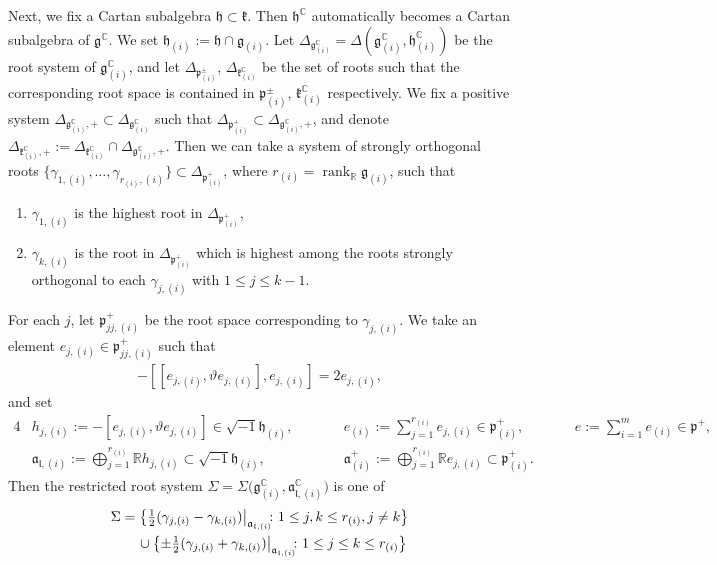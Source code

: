 \documentclass[pdftex]{sigma}
\numberwithin{equation}{section}
\newcommand{\BR}{\mathbb{R}}
\newcommand{\BC}{\mathbb{C}}
\newcommand{\fa}{\mathfrak{a}}
\newcommand{\fg}{\mathfrak{g}}
\newcommand{\fh}{\mathfrak{h}}
\newcommand{\fk}{\mathfrak{k}}
\newcommand{\fl}{\mathfrak{l}}
\newcommand{\fp}{\mathfrak{p}}
\newcommand{\rank}{\operatorname{rank}}
\begin{document}
Next, we fix a Cartan subalgebra $\fh\subset\fk$. Then $\fh^\BC$ automatically becomes a Cartan subalgebra of $\fg^\BC$.
We set $\fh_{(i)}:=\fh\cap\fg_{(i)}$.
Let $\Delta_{\fg^\BC_{(i)}}=\Delta(\fg^\BC_{(i)},\fh^{\BC}_{(i)})$ be the root system of $\fg^\BC_{(i)}$,
and let $\Delta_{\fp^\pm_{(i)}}$, $\Delta_{\fk^\BC_{(i)}}$ be the set of roots
such that the corresponding root space is contained in $\fp^\pm_{(i)}$, $\fk^\BC_{(i)}$ respectively.
We fix a positive system $\Delta_{\fg^\BC_{(i)},+}\subset \Delta_{\fg^\BC_{(i)}}$
such that $\Delta_{\fp^+_{(i)}}\subset\Delta_{\fg^\BC_{(i)},+}$,
and denote $\Delta_{\fk^\BC_{(i)},+}:=\Delta_{\fk^\BC_{(i)}}\cap \Delta_{\fg^\BC_{(i)},+}$.
Then we can take a system of strongly orthogonal roots
$\{\gamma_{1,(i)},\ldots,\gamma_{r_{(i)},(i)}\}\subset \Delta_{\fp^+_{(i)}}$,
where $r_{(i)}=\rank_\BR\fg_{(i)}$, such that
\begin{enumerate}\itemsep=0pt
\item $\gamma_{1,(i)}$ is the highest root in $\Delta_{\fp^+_{(i)}}$,
\item $\gamma_{k,(i)}$ is the root in $\Delta_{\fp^+_{(i)}}$
which is highest among the roots strongly orthogonal to each $\gamma_{j,(i)}$ with $1\le j\le k-1$.
\end{enumerate}
For each $j$, let $\fp^+_{jj,(i)}$ be the root space corresponding to $\gamma_{j,(i)}$.
We take an element $e_{j,(i)}\in\fp^+_{jj,(i)}$ such that
\begin{gather*} -[[e_{j,(i)},\vartheta e_{j,(i)}],e_{j,(i)}]=2e_{j,(i)}, \end{gather*}
and set
\begin{alignat*}{4}
& h_{j,(i)}:=-[e_{j,(i)},\vartheta e_{j,(i)}]\in\sqrt{-1}\fh_{(i)},\qquad && e_{(i)}:=\sum_{j=1}^{r_{(i)}}e_{j,(i)}\in\fp^+_{(i)},\qquad && e:=\sum_{i=1}^m e_{(i)}\in\fp^+,& \\
&\fa_{\fl,(i)}:=\bigoplus_{j=1}^{r_{(i)}}\BR h_{j,(i)}\subset\sqrt{-1}\fh_{(i)},\qquad && \fa_{(i)}^+:=\bigoplus_{j=1}^{r_{(i)}}\BR e_{j,(i)}\subset\fp^+_{(i)}.&&&
\end{alignat*}
Then the restricted root system $\Sigma=\Sigma\big(\fg^\BC_{(i)},\fa_{\fl,(i)}^\BC\big)$ is one of
\begin{gather*} \Sigma=\big\{ \tfrac{1}{2}(\gamma_{j,(i)}-\gamma_{k,(i)})\big|_{\fa_{\fl,(i)}}\!\!\colon
 1\le j, k\le r_{(i)}, j\ne k \big\}\\
 \hphantom{\Sigma=}{}
\cup\big\{{\pm}\tfrac{1}{2}(\gamma_{j,(i)}+\gamma_{k,(i)})\big|_{\fa_{\fl,(i)}}\!\!\colon 1\le j\le k\le r_{(i)}\big\} \end{gather*}
\end{document}
